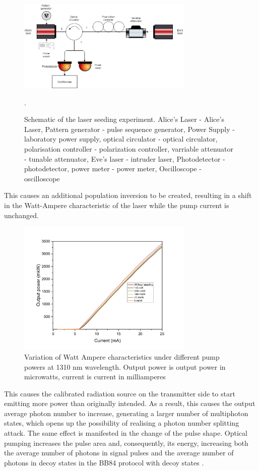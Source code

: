 {\begin{figure}
    \centering
    \includegraphics[width=0.75\textwidth]{images/1310 experiment.png}
    \caption{Schematic of the laser seeding experiment. Alice's Laser - Alice's Laser, Pattern generator - pulse sequence generator, Power Supply - laboratory power supply, optical circulator - optical circulator, polarisation controller - polarization controller, varriable attenuator - tunable attenuator, Eve's laser - intruder laser, Photodetector - photodetector, power meter - power meter, Oscilloscope - oscilloscope}.
\label{fig:exper 1310 syn}
\end{figure}
This causes an additional population inversion to be created, resulting in a shift in the Watt-Ampere characteristic of the laser while the pump current is unchanged.
\begin{figure}
    \centering
    \includegraphics[width=0.75\textwidth]{images/ватт ампер для диссера.png}
    \caption{Variation of Watt Ampere characteristics under different pump powers at 1310 nm wavelength. Output power is output power in microwatts, current is current in milliamperes}
    \label{fig:watt-amp syn}
\end{figure}
This causes the calibrated radiation source on the transmitter side to start emitting more power than originally intended. As a result, this causes the output average photon number to increase, generating a larger number of multiphoton states, which opens up the possibility of realising a photon number splitting attack. The same effect is manifested in the change of the pulse shape. Optical pumping \cite{svelto2010,okamoto2003,guina2017} increases the pulse area and, consequently, its energy, increasing both the average number of photons in signal pulses and the average number of photons in decoy states in the BB84 protocol with decoy states \cite{liu2020}.

}
